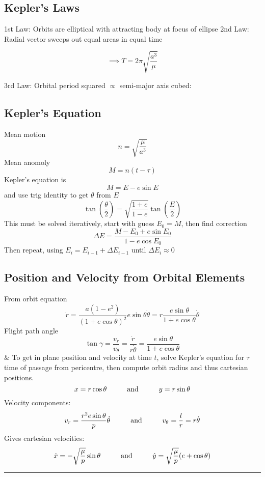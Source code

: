 \documentclass[table,cmyk]{article}
\begin{document}
\begin{longtable}
\subsection*{Kepler's Laws}
1st Law: Orbits are elliptical with attracting body at focus of ellipse
\newline
\newline
2nd Law: Radial vector sweeps out equal areas in equal time

\[\implies T = 2\pi\sqrt{\frac{a^3}{\mu}} \]

3rd Law: Orbital period squared $\propto$ semi-major axis cubed:
\subsection*{Kepler's Equation}
Mean motion
\[n=\sqrt{\frac{\mu}{a^3}}\]
Mean anomoly
\[M=n(t-\tau)\]
Kepler's equation is
\[M=E-e\sin E\]
and use trig identity to get $\theta$ from $E$
\[\tan \left(\frac{\theta}{2}\right) = \sqrt{\frac{1+e}{1-e}}\tan \left(\frac{E}{2}\right)\]
This must be solved iteratively, start with guess $E_0 = M$, then find correction
\[\Delta E = \frac{M-E_0+e\sin E_0}{1-e\cos E_0}\]
Then repeat, using $E_i = E_{i-1}+\Delta E_{i-1}$ until $\Delta E_i \approx 0$

\subsection*{Position and Velocity from Orbital Elements}
From orbit equation
\[\dot{r} = \frac{a(1-e^2)}{(1+e\cos \theta)^2} e\sin \theta \dot{\theta} = r\frac{e\sin \theta}{1+e\cos \theta} \dot{\theta}\]
Flight path angle
\[\tan \gamma = \frac{v_r}{v_\theta}=\frac{\dot{r}}{r\dot{\theta}}=\frac{e\sin \theta}{1+e \cos \theta}\]
&
To get in plane position and velocity at time $t$, solve Kepler's equation for $\tau$ time of passage from pericentre, then compute orbit radius and thus cartesian positions.
\[x = r\cos \theta \text{\hspace{1cm}and\hspace{1cm}} y = r\sin \theta\]
Velocity components:
\[v_r = \frac{r^2e\sin \theta}{p}\dot{\theta}\text{\hspace{1cm}and\hspace{1cm}}v_\theta = \frac{l}{r} = r\dot{\theta}\]
Gives cartesian velocities:
\[\dot{x} = -\sqrt{\frac{\mu}{p}}\sin \theta \text{\hspace{1cm}and\hspace{1cm}}\dot{y} = \sqrt{\frac{\mu}{p}}(e+\cos \theta)\]
\noindent\rule{9cm}{0.4pt}

\end{longtable}
\end{document}
